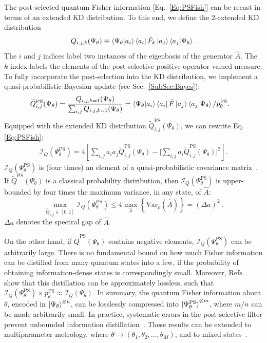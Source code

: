 \documentclass[%
 reprint,
superscriptaddress,
nofootinbib,
bibnotes,
 amsmath,amssymb,
 aps,
]{revtex4-1}
\theoremstyle{plain}
\newcommand{\pps}{p_{\theta}^{\mathrm{PS}}}
\newcommand{\PsiT}{\Psi_{\theta}}
\newcommand{\PsT}{\Psi_{\theta}^{\mathrm{PS}}}
\begin{document}
The post-selected quantum Fisher information [Eq.~\eqref{Eq:PSFish}] can be recast in terms of an extended KD distribution. To this end, we define the $2$-extended KD distribution
\begin{equation}
\label{Eq:PSMetKD}
Q_{i,j,k}(\PsiT) \equiv \braket{\PsiT | a_i} \bra{a_i} \hat{F}_k \ket{a_j} \braket{a_j|\PsiT} .
\end{equation}
The $i$ and $j$ indices label two instances of the eigenbasis of the generator $\hat{A}$. The $k$ index labels the elements of the post-selective positive-operator-valued measure.
To fully incorporate the post-selection into the KD distribution, we implement a quasi-probabilistic Bayesian update (see Sec.~\ref{SubSec:Bayes}):
\begin{align}
\tilde{Q}_{i,j}^{\mathrm{PS}}(\PsiT) 
& = \frac{Q_{i,j,k=1}(\PsiT) }{\sum_{i,j} Q_{i,j,k=1}(\PsiT) }  
= \braket{\PsiT | a_i} \bra{a_i} \hat{F} \ket{a_j} \braket{a_j|\PsiT} / \pps .
\end{align}
Equipped with the extended KD distribution $\tilde{Q}_{i,j}^{\mathrm{PS}}(\PsiT) $, we can rewrite Eq.  \eqref{Eq:PSFish}:
\begin{align}
\label{Eq:PSFishKD}
\mathcal{I}_Q \left( \PsT \right) = 4 \left[ \sum_{i,j} a_i a_j \tilde{Q}_{i,j}^{\mathrm{PS}}(\PsiT) - \bigg| \sum_{i,j} a_i \tilde{Q}_{i,j}^{\mathrm{PS}}(\PsiT) \bigg|^2  \right] .
\end{align}
$\mathcal{I}_Q \left( \PsT \right)$ is (four times) 
an element of a quasi-probabilistic covariance matrix~\cite{Jenne22}.
If $\tilde{Q}^{\mathrm{PS}}(\PsiT) $ is a classical probability distribution, 
then $\mathcal{I}_Q \left( \PsT \right)$ is upper-bounded by four times the maximum variance, in any state, of $\hat{A}$:
\begin{equation}
\max_{\tilde{Q}_{i,j} \in [0,1] } \mathcal{I}_Q \left( \PsT \right) \leq 4 \max_{\hat{\rho}} \left\{ \mathrm{Var}_{\hat{\rho}}\left( \hat{A} \right) \right\}= \left( \Delta a \right)^2 \, .
\end{equation}
$\Delta a$ denotes the spectral gap of $\hat{A}$.  

On the other hand, if $\tilde{Q}^{\mathrm{PS}}(\PsiT) $ contains negative elements, $\mathcal{I}_Q \left( \PsT \right)$ can be arbitrarily large.  
There is no fundamental bound on how much Fisher information can be distilled from many quantum states into a few, if the probability of obtaining information-dense states is correspondingly small. Moreover, Refs.~\cite{Jenne22,Salvati23} show that this  distillation can be approximately lossless, such that $\mathcal{I}_Q \left( \PsT \right) \times \pps \approx \mathcal{I}_Q \left( \PsiT \right)$. 
In summary, the quantum Fisher information about $\theta$, encoded in $\ket{\Psi_{\theta}}^{\otimes n}$, can be losslessly compressed into $\ket{\PsT}^{\otimes m}$, where $m/n$ can be made arbitrarily small. In practice, systematic errors in the post-selective filter prevent unbounded information distillation~\cite{Salvati23}. 
These results can be extended to multiparameter metrology, where $\theta \rightarrow (\theta_1, \theta_2,    \ldots,\theta_M)$, and to mixed states~\cite{Jenne22,Salvati23}.  
\end{document}
